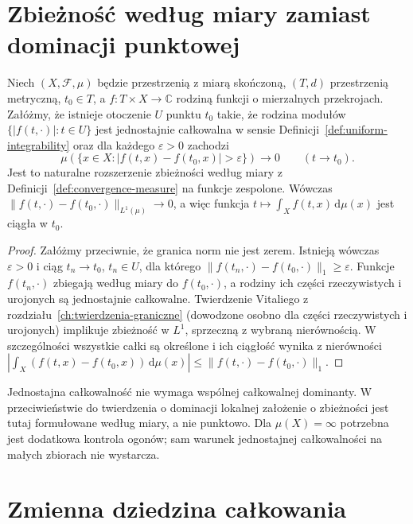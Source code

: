 \section{Zbieżność według miary zamiast dominacji punktowej}

\begin{twierdzenie}
\label{thm:param-vitali-11}
Niech $(X,\mathcal F,\mu)$ będzie przestrzenią z miarą
skończoną, $(T,d)$ przestrzenią metryczną, $t_0\in T$,
a $f:T\times X\to\mathbb C$ rodziną funkcji o mierzalnych
przekrojach. Załóżmy, że istnieje otoczenie $U$ punktu
$t_0$ takie, że rodzina modułów
$\{|f(t,\cdot)|:t\in U\}$ jest jednostajnie całkowalna
w sensie Definicji~\ref{def:uniform-integrability}
oraz dla każdego $\varepsilon>0$ zachodzi
\[
\mu(\{x\in X:|f(t,x)-f(t_0,x)|>\varepsilon\})
\longrightarrow0\qquad(t\to t_0).
\]
Jest to naturalne rozszerzenie zbieżności według miary
z Definicji~\ref{def:convergence-measure} na funkcje
zespolone. Wówczas
$\|f(t,\cdot)-f(t_0,\cdot)\|_{L^1(\mu)}\to0$,
a więc funkcja $t\mapsto\int_X f(t,x)\,\mathrm d\mu(x)$
jest ciągła w $t_0$.
\end{twierdzenie}
\begin{proof}
Załóżmy przeciwnie, że granica norm nie jest zerem.
Istnieją wówczas $\varepsilon>0$ i ciąg $t_n\to t_0$,
$t_n\in U$, dla którego
$\|f(t_n,\cdot)-f(t_0,\cdot)\|_1\ge\varepsilon$.
Funkcje $f(t_n,\cdot)$ zbiegają według miary do
$f(t_0,\cdot)$, a rodziny ich części rzeczywistych i urojonych
są jednostajnie całkowalne. Twierdzenie Vitaliego
z rozdziału~\ref{ch:twierdzenia-graniczne}
(dowodzone osobno dla części rzeczywistych i urojonych)
implikuje zbieżność w $L^1$, sprzeczną z wybraną
nierównością. W szczególności wszystkie całki
są określone i ich ciągłość wynika z nierówności
$|\int_X(f(t,x)-f(t_0,x))\,\mathrm d\mu(x)|
\le\|f(t,\cdot)-f(t_0,\cdot)\|_1$.
\end{proof}

\begin{uwaga}
Jednostajna całkowalność nie wymaga wspólnej
całkowalnej dominanty. W przeciwieństwie do twierdzenia
o dominacji lokalnej założenie o zbieżności jest tutaj
formułowane według miary, a nie punktowo. Dla $\mu(X)=\infty$
potrzebna jest dodatkowa kontrola ogonów; sam warunek
jednostajnej całkowalności na małych zbiorach nie wystarcza.
\end{uwaga}

\section{Zmienna dziedzina całkowania}

